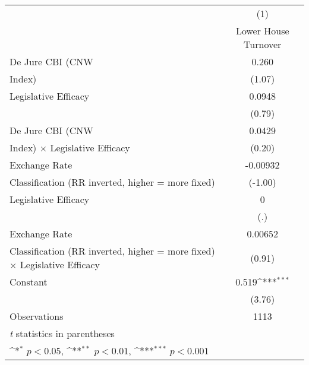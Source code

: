 {
\def\sym#1{\ifmmode^{#1}\else\(^{#1}\)\fi}
\begin{tabular}{l*{1}{c}}
\hline\hline
                    &\multicolumn{1}{c}{(1)}\\
                    &\multicolumn{1}{c}{Lower House Turnover}\\
\hline
De Jure CBI (CNW    &       0.260         \\
Index)              &      (1.07)         \\
[1em]
Legislative Efficacy&      0.0948         \\
                    &      (0.79)         \\
[1em]
De Jure CBI (CNW    &      0.0429         \\
Index) $\times$ Legislative Efficacy&      (0.20)         \\
[1em]
Exchange Rate       &    -0.00932         \\
Classification (RR inverted, higher = more fixed)&     (-1.00)         \\
[1em]
Legislative Efficacy&           0         \\
                    &         (.)         \\
[1em]
Exchange Rate       &     0.00652         \\
Classification (RR inverted, higher = more fixed) $\times$ Legislative Efficacy&      (0.91)         \\
[1em]
Constant            &       0.519\sym{***}\\
                    &      (3.76)         \\
\hline
Observations        &        1113         \\
\hline\hline
\multicolumn{2}{l}{\footnotesize \textit{t} statistics in parentheses}\\
\multicolumn{2}{l}{\footnotesize \sym{*} \(p<0.05\), \sym{**} \(p<0.01\), \sym{***} \(p<0.001\)}\\
\end{tabular}
}

